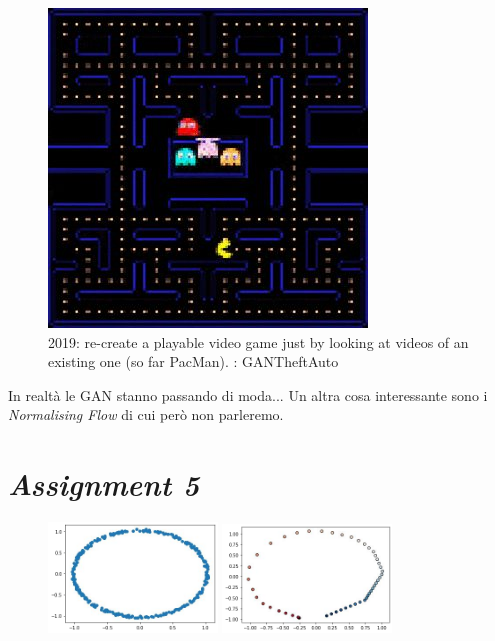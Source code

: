 \begin{figure}[ht]
	\centering
	\includegraphics[width=0.33\linewidth]{figure_ml/pacman.png}
	\caption{2019: re-create a		playable video game	just by looking at videos of an existing one (so far PacMan). : GANTheftAuto}
\end{figure}


In realtà le GAN stanno passando di moda... Un altra cosa interessante sono i \textit{Normalising Flow} di cui però non parleremo.

\newpage

\section{\textit{Assignment 5}}

\begin{figure}
	\includegraphics[width=0.4\textwidth]{figure_ml/ass5_1.png}
	\includegraphics[width=0.4\textwidth]{figure_ml/ass5_2.png}
\end{figure} 


